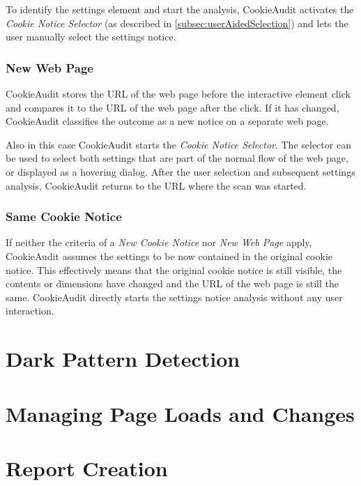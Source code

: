 To identify the settings element and start the analysis, CookieAudit activates the \emph{Cookie Notice Selector} (as described in \cref{subsec:userAidedSelection}) and lets the user manually select the settings notice.

\subsubsection{New Web Page}
CookieAudit stores the URL of the web page before the interactive element click and compares it to the URL of the web page after the click.
If it has changed, CookieAudit classifies the outcome as a new notice on a separate web page.

Also in this case CookieAudit starts the \emph{Cookie Notice Selector}. 
The selector can be used to select both settings that are part of the normal flow of the web page, or displayed as a hovering dialog.
After the user selection and subsequent settings analysis, CookieAudit returns to the URL where the scan was started.

\subsubsection{Same Cookie Notice}
If neither the criteria of a \emph{New Cookie Notice} nor \emph{New Web Page} apply, CookieAudit assumes the settings to be now contained in the original cookie notice.
This effectively means that the original cookie notice is still visible, the contents or dimensions have changed and the URL of the web page is still the same.
CookieAudit directly starts the settings notice analysis without any user interaction.

\section{Dark Pattern Detection}
\section{Managing Page Loads and Changes}
\section{Report Creation}
